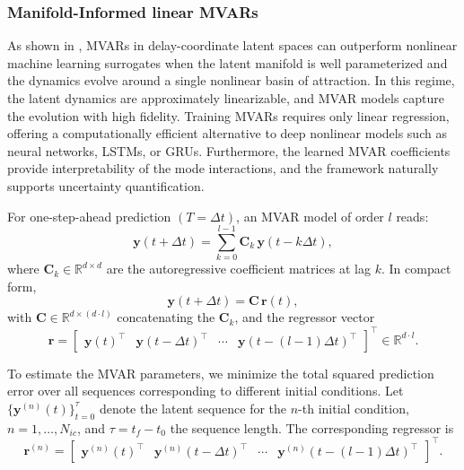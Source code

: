 \documentclass{article}
\begin{document}
\subsubsection{Manifold-Informed linear MVARs}
\label{subsec:multivariate}

As shown in \cite{papaioannou2022time}, MVARs in delay-coordinate latent spaces \cite{shvartsman1998low,dylewsky2022principal,kemeth2022learning,axaas2023model,gallos2024data,patil2025separation} can outperform nonlinear machine learning surrogates when the latent manifold is well parameterized and the dynamics evolve around a single nonlinear basin of attraction. In this regime, the latent dynamics are approximately linearizable, and MVAR models capture the evolution with high fidelity. Training MVARs requires only linear regression, offering a computationally efficient alternative to deep nonlinear models such as neural networks, LSTMs, or GRUs. Furthermore, the learned MVAR coefficients provide interpretability of the mode interactions, and the framework naturally supports uncertainty quantification. 

For one-step-ahead prediction $(T=\Delta t)$, an MVAR model of order $l$ reads:
\begin{equation}
\mathbf{y}(t + \Delta t) = \sum_{k=0}^{l-1} \mathbf{C}_k \, \mathbf{y}(t - k\Delta t),
\label{eq:mar_latent_y}
\end{equation}
where $\mathbf{C}_k \in \mathbb{R}^{d \times d}$ are the autoregressive coefficient matrices at lag $k$. In compact form,
\begin{equation}
\mathbf{y}(t + \Delta t) = \mathbf{C} \, \mathbf{r}(t),
\label{eq:mar_compact_y}
\end{equation}
with $\mathbf{C} \in \mathbb{R}^{d \times (d \cdot l)}$ concatenating the $\mathbf{C}_k$, and the regressor vector
\begin{equation}
\label{eq:regressor}
\mathbf{r} = \begin{bmatrix} 
\mathbf{y}(t)^\top & \mathbf{y}(t - \Delta t)^\top & \cdots & \mathbf{y}(t - (l-1)\Delta t)^\top
\end{bmatrix}^\top \in \mathbb{R}^{d \cdot l}.
\end{equation}

To estimate the MVAR parameters, we minimize the total squared prediction error over all sequences corresponding to different initial conditions. Let $\{\mathbf{y}^{(n)}(t)\}_{t=0}^{\tau}$ denote the latent sequence for the $n$-th initial condition, $n = 1,\dots, N_{ic}$, and $\tau = t_f - t_0$ the sequence length. The corresponding regressor is
\[
\mathbf{r}^{(n)} = \begin{bmatrix} 
\mathbf{y}^{(n)}(t)^\top & \mathbf{y}^{(n)}(t - \Delta t)^\top & \cdots & \mathbf{y}^{(n)}(t - (l-1)\Delta t)^\top
\end{bmatrix}^\top.
\]
\end{document}
